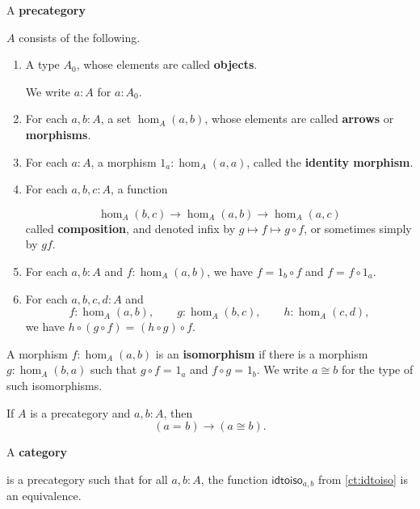 \documentclass[10pt,a4paper]{article}
\providecommand{\index}[1]{}
\newcommand{\define}[1]{\textbf{#1}}
\newcommand{\id}[3][]{\ensuremath{#2 =_{#1} #3}\xspace}
\newcommand{\idtoiso}{\ensuremath{\mathsf{idtoiso}}\xspace}
\theoremstyle{definition}
\theoremstyle{remark}
\numberwithin{equation}{section}
\newcommand{\indexdef}[1]{\index{#1|defstyle}}   %
\newcommand{\indexsee}[2]{\index{#1|see{#2}}}    %
\begin{document}
\begin{defn}\label{ct:precategory}
  A \define{precategory}
  \indexdef{precategory}
  $A$ consists of the following.
  \begin{enumerate}
  \item A type $A_0$, whose elements are called \define{objects}.%
    \indexdef{object!in a (pre)category}
    We write $a:A$ for $a:A_0$.
  \item For each $a,b:A$, a set $\hom_A(a,b)$, whose elements are called \define{arrows} or \define{morphisms}.%
    \indexsee{arrow}{morphism}%
    \indexdef{morphism!in a (pre)category}%
    \indexdef{hom-set}%
  \item For each $a:A$, a morphism $1_a:\hom_A(a,a)$, called the \define{identity morphism}.%
    \indexdef{identity!morphism in a (pre)category}
  \item For each $a,b,c:A$, a function%
    \indexdef{composition!of morphisms in a (pre)category}
    \[  \hom_A(b,c) \to \hom_A(a,b) \to \hom_A(a,c) \]
    called \define{composition}, and denoted infix by $g\mapsto f\mapsto g\circ f$, or sometimes simply by $gf$.
  \item For each $a,b:A$ and $f:\hom_A(a,b)$, we have $\id f {1_b\circ f}$ and $\id f {f\circ 1_a}$.
  \item For each $a,b,c,d:A$ and
    \begin{equation*}
      f:\hom_A(a,b), \qquad
      g:\hom_A(b,c), \qquad
      h:\hom_A(c,d),
    \end{equation*}
    we have $\id {h\circ (g\circ f)}{(h\circ g)\circ f}$.
  \end{enumerate}
\end{defn}

\begin{defn}\label{ct:isomorphism}
  A morphism $f:\hom_A(a,b)$ is an \define{isomorphism}
  \indexdef{isomorphism!in a (pre)category}%
  if there is a morphism $g:\hom_A(b,a)$ such that $\id{g\circ f}{1_a}$ and $\id{f\circ g}{1_b}$.
  We write $a\cong b$ for the type of such isomorphisms.
\end{defn}

\begin{lem}\label{ct:idtoiso}
  If $A$ is a precategory and $a,b:A$, then
  \[(\id a b)\to (a \cong b).\]
\end{lem}

\begin{defn}\label{ct:category}
  A \define{category}
  \indexdef{category}
  is a precategory such that for all $a,b:A$, the function $\idtoiso_{a,b}$ from \cref{ct:idtoiso} is an equivalence.
\end{defn}
\end{document}
